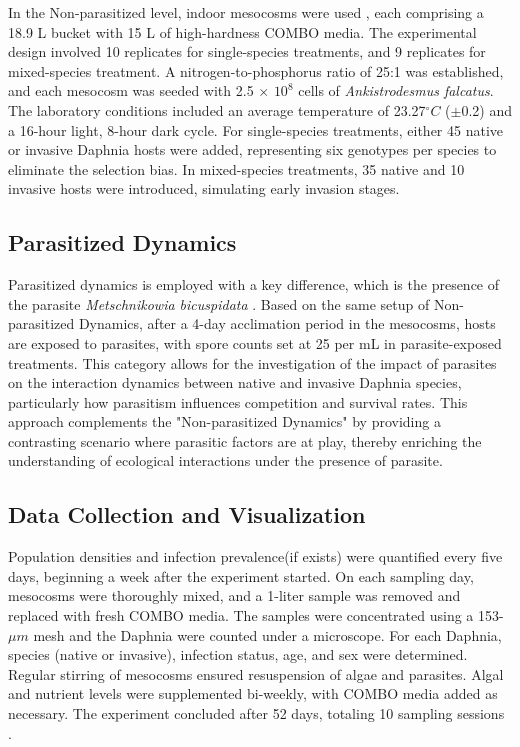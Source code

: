 \documentclass[12pt]{article}
\begin{document}
In the Non-parasitized level, indoor mesocosms were used \citep{Searle2016}, each comprising a 18.9 L bucket with 15 L of high-hardness COMBO media. The experimental design involved 10 replicates for single-species treatments, and 9 replicates for mixed-species treatment. A nitrogen-to-phosphorus ratio of 25:1 was established, and each mesocosm was seeded with 2.5 $\times$ $10^8$ cells of \textit{Ankistrodesmus falcatus}. The laboratory conditions included an average temperature of 23.27$^\circ C$ ($\pm$0.2) and a 16-hour light, 8-hour dark cycle. For single-species treatments, either 45 native or invasive Daphnia hosts were added, representing six genotypes per species to eliminate the selection bias. In mixed-species treatments, 35 native and 10 invasive hosts were introduced, simulating early invasion stages.\\

\subsection{Parasitized Dynamics}
Parasitized dynamics is employed with a key difference, which is the presence of the parasite \textit{Metschnikowia bicuspidata} . Based on the same setup of Non-parasitized Dynamics, after a 4-day acclimation period in the mesocosms, hosts are exposed to parasites, with spore counts set at 25 per mL in parasite-exposed treatments. This category allows for the investigation of the impact of parasites on the interaction dynamics between native and invasive Daphnia species, particularly how parasitism influences competition and survival rates. This approach complements the "Non-parasitized Dynamics" by providing a contrasting scenario where parasitic factors are at play, thereby enriching the understanding of ecological interactions under the presence of parasite.\\

\subsection{Data Collection and Visualization}
Population densities and infection prevalence(if exists) were quantified every five days, beginning a week after the experiment started. On each sampling day, mesocosms were thoroughly mixed, and a 1-liter sample was removed and replaced with fresh COMBO media. The samples were concentrated using a 153-$\mu m$ mesh and the Daphnia were counted under a microscope. For each Daphnia, species (native or invasive), infection status, age, and sex were determined. Regular stirring of mesocosms ensured resuspension of algae and parasites. Algal and nutrient levels were supplemented bi-weekly, with COMBO media added as necessary. The experiment concluded after 52 days, totaling 10 sampling sessions \citep{Searle2016}.\\
\end{document}
